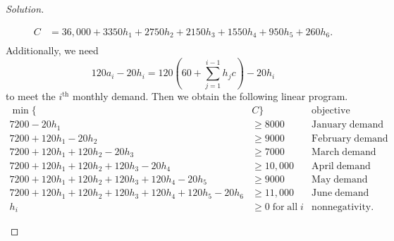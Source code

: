 \documentclass[ 12pt ]{article}
\begin{document}
\begin{enumerate}
\begin{proof}[Solution]
\begin{enumerate}
\begin{align*}
						C &= 36,000 + 3350h_1 + 2750h_2 + 2150h_3 + 1550h_4 + 950h_5 + 260h_6. \\
					\end{align*}
					Additionally, we need $$120a_i - 20h_i = 120\left ( 60 + \sum_{j = 1}^{i-1} h_jc\right ) - 20h_i$$ to meet the $i^{\mathrm{th}}$ monthly demand. Then we obtain the
					following linear program.
					\begin{align*}
						\min \{ &C \} &\mathrm{objective} \\
						7200 - 20h_1 &\geq 8000 &\mathrm{January\; demand} \\
						7200 + 120h_1 - 20h_2 &\geq 9000 &\mathrm{February\; demand} \\
						7200 + 120h_1 + 120h_2 - 20h_3 &\geq 7000 &\mathrm{March\; demand} \\
						7200 + 120h_1 + 120h_2 + 120h_3 - 20h_4 &\geq 10,000 &\mathrm{April\; demand} \\
						7200 + 120h_1 + 120h_2 + 120h_3 + 120h_4 - 20h_5 &\geq 9000 &\mathrm{May\; demand} \\
						7200 + 120h_1 + 120h_2 + 120h_3 + 120h_4 + 120h_5 - 20h_6 &\geq 11,000 &\mathrm{June\; demand} \\
						h_i &\geq 0\; \mathrm{for\; all\;} i &\mathrm{nonnegativity}.
					\end{align*}
			\end{enumerate}
		\end{proof}

\end{enumerate}
\end{document}
